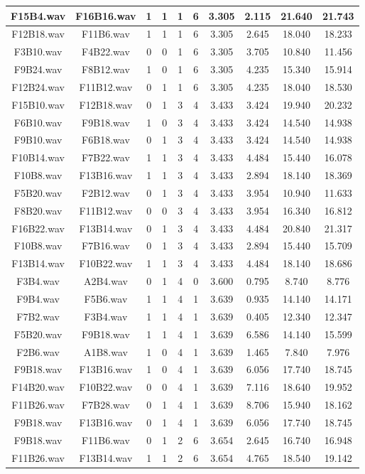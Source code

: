 \documentclass[11pt,a4paper,twoside]{book}
\begin{document}
\begin{longtable}[c]{|c|c|c|c|c|c|c|c|c|c|}
F15B4.wav&F16B16.wav&1&1&1&6&3.305&2.115&21.640&21.743\\ \hline
F12B18.wav&F11B6.wav&1&1&1&6&3.305&2.645&18.040&18.233\\ \hline
F3B10.wav&F4B22.wav&0&0&1&6&3.305&3.705&10.840&11.456\\ \hline
F9B24.wav&F8B12.wav&1&0&1&6&3.305&4.235&15.340&15.914\\ \hline
F12B24.wav&F11B12.wav&0&1&1&6&3.305&4.235&18.040&18.530\\ \hline
F15B10.wav&F12B18.wav&0&1&3&4&3.433&3.424&19.940&20.232\\ \hline
F6B10.wav&F9B18.wav&1&0&3&4&3.433&3.424&14.540&14.938\\ \hline
F9B10.wav&F6B18.wav&0&1&3&4&3.433&3.424&14.540&14.938\\ \hline
F10B14.wav&F7B22.wav&1&1&3&4&3.433&4.484&15.440&16.078\\ \hline
F10B8.wav&F13B16.wav&1&1&3&4&3.433&2.894&18.140&18.369\\ \hline
F5B20.wav&F2B12.wav&0&1&3&4&3.433&3.954&10.940&11.633\\ \hline
F8B20.wav&F11B12.wav&0&0&3&4&3.433&3.954&16.340&16.812\\ \hline
F16B22.wav&F13B14.wav&0&1&3&4&3.433&4.484&20.840&21.317\\ \hline
F10B8.wav&F7B16.wav&0&1&3&4&3.433&2.894&15.440&15.709\\ \hline
F13B14.wav&F10B22.wav&1&1&3&4&3.433&4.484&18.140&18.686\\ \hline
F3B4.wav&A2B4.wav&0&1&4&0&3.600&0.795&8.740&8.776\\ \hline
F9B4.wav&F5B6.wav&1&1&4&1&3.639&0.935&14.140&14.171\\ \hline
F7B2.wav&F3B4.wav&1&1&4&1&3.639&0.405&12.340&12.347\\ \hline
F5B20.wav&F9B18.wav&1&1&4&1&3.639&6.586&14.140&15.599\\ \hline
F2B6.wav&A1B8.wav&1&0&4&1&3.639&1.465&7.840&7.976\\ \hline
F9B18.wav&F13B16.wav&1&0&4&1&3.639&6.056&17.740&18.745\\ \hline
F14B20.wav&F10B22.wav&0&0&4&1&3.639&7.116&18.640&19.952\\ \hline
F11B26.wav&F7B28.wav&0&1&4&1&3.639&8.706&15.940&18.162\\ \hline
F9B18.wav&F13B16.wav&0&1&4&1&3.639&6.056&17.740&18.745\\ \hline
F9B18.wav&F11B6.wav&0&1&2&6&3.654&2.645&16.740&16.948\\ \hline
F11B26.wav&F13B14.wav&1&1&2&6&3.654&4.765&18.540&19.142\\ \hline

\end{longtable}
\end{document}
